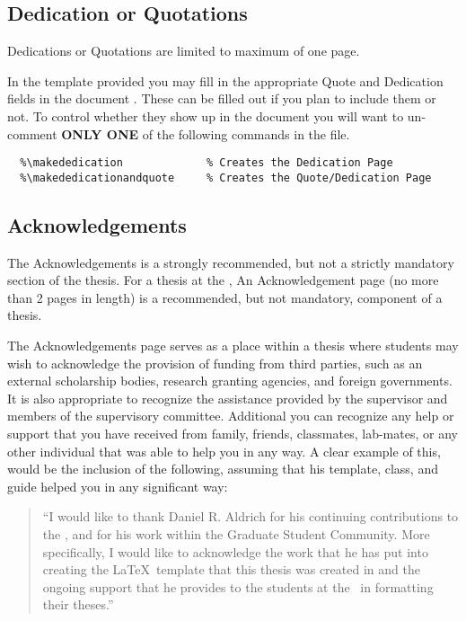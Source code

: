 		\subsection{Dedication or Quotations}\label{quote}\label{dedication}
			Dedications or Quotations are limited to maximum of one page.
			
			In the template provided you may fill in the appropriate Quote and Dedication fields in the document .
			These can be filled out if you plan to include them or not.
			To control whether they show up in the document you will want to un-comment \textbf{ONLY ONE} of the following commands in the  file.

			\begin{lstlisting}[float=ht,caption=Quote and Dedication Inclusion Options (un-comment only one),label=lst:QuotesAndDedication,style=LaTeXStyle,basicstyle=\scriptsize\ttfamily,]
  %\makequote                  % Creates the Quote Page
  %\makededication             % Creates the Dedication Page
  %\makededicationandquote     % Creates the Quote/Dedication Page
			\end{lstlisting}

		\subsection{Acknowledgements}\label{acknowledgement}
			The Acknowledgements is a strongly recommended, but not a strictly mandatory section of the thesis.
			For a thesis at the \UofA, 
			An Acknowledgement page (no more than 2 pages in length) is a recommended, but not mandatory, component of a thesis.
	
			The Acknowledgements page serves as a place within a thesis where students may wish to acknowledge the provision of funding from third parties, such as an external scholarship bodies, research granting agencies, and foreign governments. 
			It is also appropriate to recognize the assistance provided by the supervisor and members of the supervisory committee.
			Additional you can recognize any help or support that you have received from family, friends, classmates, lab-mates, or any other individual that was able to help you in any way.
			A clear example of this, would be the inclusion of the following, assuming that his template, class, and guide helped you in any significant way:
			
			\begin{quote}
				\enquote{I would like to thank Daniel R. Aldrich for his continuing contributions to the \UofA, and for his work within the Graduate Student Community. More specifically, I would like to acknowledge the work that he has put into creating the \LaTeX\ template that this thesis was created in and the ongoing support that he provides to the students at the \UofA\ in formatting their theses.}
			\end{quote}

